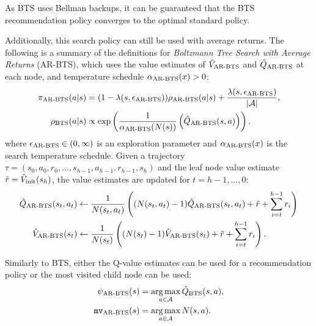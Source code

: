         As BTS uses Bellman backups, it can be guaranteed that the BTS recommendation policy converges to the optimal standard policy. 
        









        Additionally, this search policy can still be used with average returns. The following is a summary of the definitions for \textit{Boltzmann Tree Search with Average Returns} (AR-BTS), which uses the value estimates of ${\hat{V}_{{\textnormal{AR-BTS}}}}$ and ${\hat{Q}_{{\textnormal{AR-BTS}}}}$ at each node, and temperature schedule ${\alpha_{{\textnormal{AR-BTS}}}}(x) > 0$:
        \begin{align}
            {\pi_{{\textnormal{AR-BTS}}}}(a|s) &= (1-{\lambda(s,{\epsilon_{{\textnormal{AR-BTS}}}})}){\rho_{{\textnormal{AR-BTS}}}}(a|s) + \frac{{\lambda(s,{\epsilon_{{\textnormal{AR-BTS}}}})}}{|\mathcal{A}|}, 
                        \label{eq:arbts_search_policy} \\ 
            {\rho_{{\textnormal{BTS}}}}(a|s) &\propto \exp\left(\frac{1}{{\alpha_{{\textnormal{AR-BTS}}}}(N(s))}\left({\hat{Q}_{{\textnormal{AR-BTS}}}}(s,a)\right)\right).
                        \label{eq:arbts_value_policy}
        \end{align}
        where ${\epsilon_{{\textnormal{AR-BTS}}}} \in (0,\infty)$ is an exploration parameter and ${\alpha_{{\textnormal{AR-BTS}}}}(x)$ is the search temperature schedule. Given a trajectory $\tau=(s_0,a_0,r_0,...,s_{h-1},a_{h-1},r_{h-1},s_h)$ and the leaf node value estimate $\tilde{r} = {\hat{V}_{\textnormal{init}}}(s_h)$, the value estimates are updated for $t=h-1,...,0$:
        \begin{align}
            {\hat{Q}_{{\textnormal{AR-BTS}}}}(s_t,a_t) &\leftarrow 
                \frac{1}{N(s_t,a_t)} \left( (N(s_t,a_t)-1) {\hat{Q}_{{\textnormal{AR-BTS}}}}(s_t,a_t) 
                    + \tilde{r} + \sum_{i=t}^{h-1} r_i \right) \label{eq:4:arbsts_backup_q} \\
            {\hat{V}_{{\textnormal{AR-BTS}}}}(s_t) &\leftarrow 
                \frac{1}{N(s_t)} \left( (N(s_t)-1) {\hat{V}_{{\textnormal{AR-BTS}}}}(s_t) 
                    + \tilde{r} + \sum_{i=t}^{h-1} r_i \right). \label{eq:4:arbsts_backup_v} 
        \end{align}

        Similarly to BTS, either the Q-value estimates can be used for a recommendation policy or the most visited child node can be used:
        \begin{align}
            {\psi_{{\textnormal{AR-BTS}}}}(s) &= \operatorname*{arg\,max}_{a\in\mathcal{A}}{\hat{Q}_{{\textnormal{BTS}}}}(s,a), \\
            {\texttt{mv}_{{\textnormal{AR-BTS}}}}(s) &= \operatorname*{arg\,max}_{a\in\mathcal{A}} N(s,a).
        \end{align}








